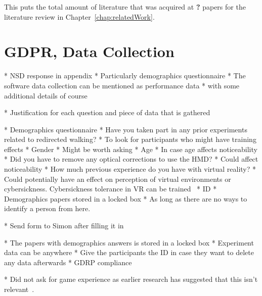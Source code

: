 This puts the total amount of literature that was acquired at \textbf{?} papers for the literature review in Chapter~\ref{chap:relatedWork}.

\section{GDPR, Data Collection}
* NSD response in appendix
* Particularly demographics questionnaire
* The software data collection can be mentioned as performance data
   * with some additional details of course
   
* Justification for each question and piece of data that is gathered

* Demographics questionnaire
   * Have you taken part in any prior experiments related to redirected walking?
      * To look for participants who might have training effects 
   * Gender
      * Might be worth asking
   * Age
      * In case age affects noticeability
   * Did you have to remove any optical corrections to use the HMD?
      * Could affect noticeability
   * How much previous experience do you have with virtual reality?
      * Could potentially have an effect on perception of virtual environments or cybersickness. Cybersickness tolerance in VR can be trained~\cite{hildebrandt2018get}
   * ID
      * Demographics papers stored in a locked box
   * As long as there are no ways to identify a person from here. 

* Send form to Simon after filling it in

* The papers with demographics answers is stored in a locked box 
* Experiment data can be anywhere
* Give the participants the ID in case they want to delete any data afterwards
   * GDRP compliance

* Did not ask for game experience as earlier research has suggested that this isn't relevant~\cite{nguyen2018individual}.

